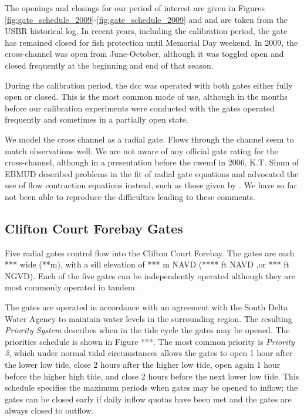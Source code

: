 The openings and closings for our period of interest are given in 
Figures \ref{fig:gate_schedule_2009}-\ref{fig:gate_schedule_2009} and
 and are taken from the USBR historical log. In recent years, including the calibration period, the gate has 
remained closed for fish protection until Memorial Day weekend. In 2009, the cross-channel was 
open from June-October, although it was toggled open and closed frequently at the beginning and end of
that season. 

During the calibration period, the \gls{dcc} was operated with both gates either fully open or closed. 
This is the most common mode of use, although in the months before our calibration experiments 
were conducted with the gates operated frequently and sometimes in a partially open state. 

We model the cross channel as a radial gate. Flows through the channel 
seem to match observations well. We are not aware of any official gate rating for the cross-channel, 
although in a presentation before the \gls{cwemf} in 2006, K.T. Shum of EBMUD 
described problems in the fit of radial gate equations and advocated the use of 
flow contraction equations instead, such as those given by \citet{Matthias67}.
We have so far not been able to reproduce the difficulties leading to these comments.

\subsection{Clifton Court Forebay Gates} Five radial gates control flow into the Clifton Court Forebay. The gates are each *** wide (**m), with a sill elevation of *** m NAVD (**** ft NAVD ,or *** ft NGVD). Each of the five gates can be independently operated although they are most commonly operated in tandem. 

The gates are operated in accordance with an agreement with the South Delta Water Agency to maintain water levels in the surrounding region. The resulting {\em Priority System} describes when in the tide cycle the gates may be opened. The priorities schedule is shown in Figure ***. The most common priority is {\em Priority 3}, which under normal tidal circumstances allows the gates to open 1 hour after the lower low tide, close 2 hours after the higher low tide, open again 1 hour before the higher high tide, and close 2 hours before the next lower low tide. This schedule specifies the maximum periods when gates may be opened to inflow; the gates can be closed early if daily inflow quotas have been met and the gates are always closed to outflow.

